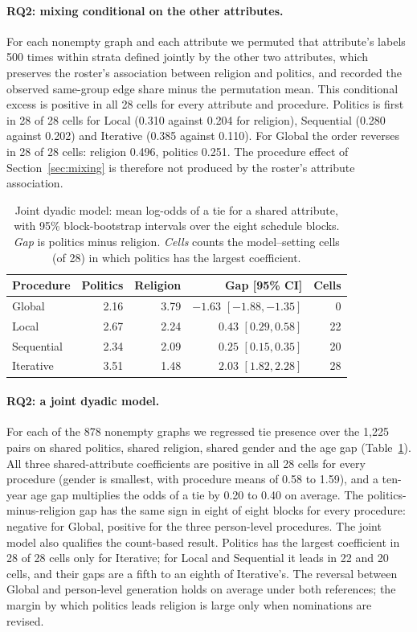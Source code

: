 \documentclass{article}
\begin{document}
\paragraph{RQ2: mixing conditional on the other attributes.} For each nonempty graph and each attribute we permuted that attribute's labels 500 times within strata defined jointly by the other two attributes, which preserves the roster's association between religion and politics, and recorded the observed same-group edge share minus the permutation mean. This conditional excess is positive in all 28 cells for every attribute and procedure. Politics is first in 28 of 28 cells for Local (0.310 against 0.204 for religion), Sequential (0.280 against 0.202) and Iterative (0.385 against 0.110). For Global the order reverses in 28 of 28 cells: religion 0.496, politics 0.251. The procedure effect of Section~\ref{sec:mixing} is therefore not produced by the roster's attribute association.

\begin{table}[t]\centering
\caption{Joint dyadic model: mean log-odds of a tie for a shared attribute, with 95\% block-bootstrap intervals over the eight schedule blocks. \emph{Gap} is politics minus religion. \emph{Cells} counts the model--setting cells (of 28) in which politics has the largest coefficient.}\label{tab:dyad}
\small\setlength{\tabcolsep}{3pt}
\begin{tabular}{lrrrr}\toprule Procedure & Politics & Religion & Gap [95\% CI] & Cells\\\midrule
Global&2.16&3.79&$-1.63$ $[-1.88,-1.35]$&0\\
Local&2.67&2.24&$0.43$ $[0.29,0.58]$&22\\
Sequential&2.34&2.09&$0.25$ $[0.15,0.35]$&20\\
Iterative&3.51&1.48&$2.03$ $[1.82,2.28]$&28\\\bottomrule\end{tabular}\end{table}

\paragraph{RQ2: a joint dyadic model.} For each of the 878 nonempty graphs we regressed tie presence over the 1{,}225 pairs on shared politics, shared religion, shared gender and the age gap (Table~\ref{tab:dyad}). All three shared-attribute coefficients are positive in all 28 cells for every procedure (gender is smallest, with procedure means of 0.58 to 1.59), and a ten-year age gap multiplies the odds of a tie by 0.20 to 0.40 on average. The politics-minus-religion gap has the same sign in eight of eight blocks for every procedure: negative for Global, positive for the three person-level procedures. The joint model also qualifies the count-based result. Politics has the largest coefficient in 28 of 28 cells only for Iterative; for Local and Sequential it leads in 22 and 20 cells, and their gaps are a fifth to an eighth of Iterative's. The reversal between Global and person-level generation holds on average under both references; the margin by which politics leads religion is large only when nominations are revised.
\end{document}
